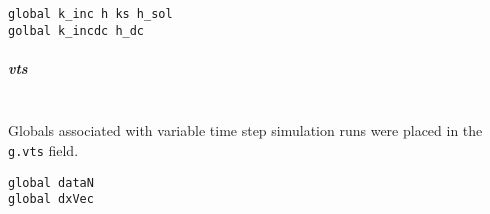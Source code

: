 \documentclass[12pt]{article}
\begin{document}
\begin{verbatim}
global k_inc h ks h_sol
golbal k_incdc h_dc
\end{verbatim}

\subparagraph{vts} \ \\
Globals associated with variable time step simulation runs were placed in the \verb|g.vts| field.

\begin{verbatim}
global dataN
global dxVec
\end{verbatim}



\begin{comment}

template for subparagraphs

\subparagraph{xxx} %
\begin{verbatim}

\end{verbatim}




\end{comment}
\end{document}
